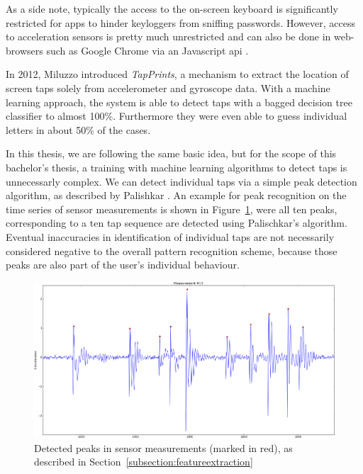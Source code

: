 As a side note, typically the access to the on-screen keyboard is significantly restricted for \glspl{app} to hinder keyloggers from sniffing passwords. However, access to acceleration sensors is pretty much unrestricted and can also be done in web-browsers such as Google Chrome via an Javascript \gls{api} \cite{devicemotionjavascript}.

In 2012, Miluzzo \etal\cite{miluzzo2012tapprints} introduced \emph{TapPrints}, a mechanism to extract the location of screen taps solely from accelerometer and gyroscope data. With a machine learning approach, the system is able to detect taps with a bagged decision tree classifier to almost 100\%. Furthermore they were even able to guess individual letters in about 50\% of the cases.

In this thesis, we are following the same basic idea, but for the scope of this bachelor's thesis, a training with machine learning algorithms to detect taps is unnecessarly complex. We can detect individual taps via a simple peak detection algorithm, as described by Palishkar \etal\cite{palshikar2009simple}. An example for peak recognition on the time series of sensor measurements is shown in Figure~\ref{fig:peakdetection}, were all ten peaks, corresponding to a ten tap sequence are detected using Palischkar's algorithm. Eventual inaccuracies in identification of individual taps are not necessarily considered negative to the overall pattern recognition scheme, because those peaks are also part of the user's individual behaviour.

\begin{figure}
    \centering
    \includegraphics[width=\linewidth]{figures/detectedPeaks.png}
    \caption{Detected peaks in sensor measurements (marked in red), as described in Section~\ref{subsection:featureextraction}}
    \label{fig:peakdetection}
\end{figure}

